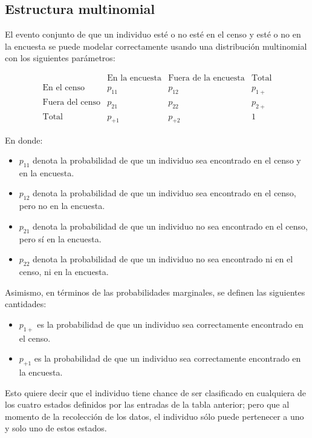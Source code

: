 \documentclass[
  12pt,
]{book}
\providecommand{\tightlist}{%
  \setlength{\itemsep}{0pt}\setlength{\parskip}{0pt}}
\begin{document}
\subsection{Estructura multinomial}\label{sec:multinomial}

El evento conjunto de que un individuo esté o no esté en el censo y esté o no en la encuesta se puede modelar correctamente usando una distribución multinomial con los siguientes parámetros:

\[
    \begin{array}{c|cc|c}
    & \text{En la encuesta} & \text{Fuera de la encuesta} & \text{Total} \\
    \hline
    \text{En el censo} & p_{11} & p_{12} & p_{1+} \\
    \text{Fuera del censo} & p_{21} & p_{22} & p_{2+} \\
    \hline
    \text{Total} & p_{+1} & p_{+2} & 1
    \end{array}
    \]

En donde:

\begin{itemize}
\tightlist
\item
  \(p_{11}\) denota la probabilidad de que un individuo sea encontrado en el censo y en la encuesta.
\item
  \(p_{12}\) denota la probabilidad de que un individuo sea encontrado en el censo, pero no en la encuesta.
\item
  \(p_{21}\) denota la probabilidad de que un individuo no sea encontrado en el censo, pero sí en la encuesta.
\item
  \(p_{22}\) denota la probabilidad de que un individuo no sea encontrado ni en el censo, ni en la encuesta.
\end{itemize}

Asimismo, en términos de las probabilidades marginales, se definen las siguientes cantidades:

\begin{itemize}
\tightlist
\item
  \(p_{1+}\) es la probabilidad de que un individuo sea correctamente encontrado en el censo.
\item
  \(p_{+1}\) es la probabilidad de que un individuo sea correctamente encontrado en la encuesta.
\end{itemize}

Esto quiere decir que el individuo tiene chance de ser clasificado en cualquiera de los cuatro estados definidos por las entradas de la tabla anterior; pero que al momento de la recolección de los datos, el individuo sólo puede pertenecer a uno y solo uno de estos estados.
\end{document}
